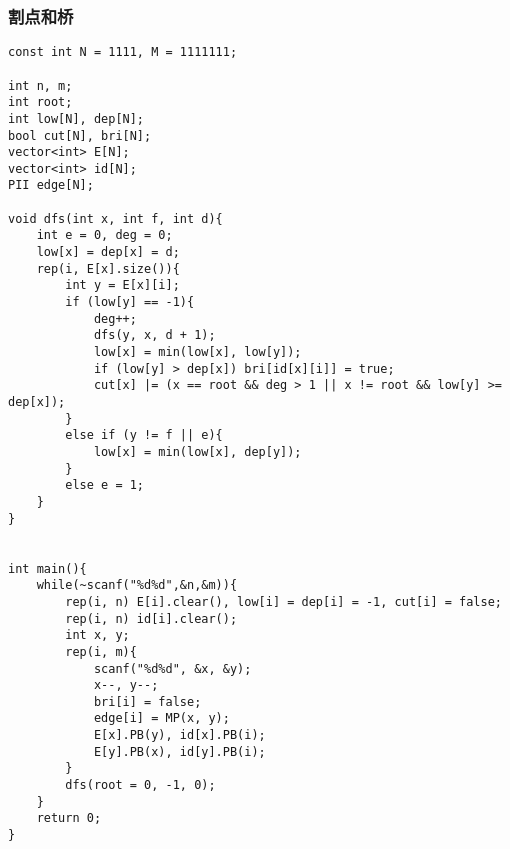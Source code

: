 \subsubsection{割点和桥}
\begin{verbatim}
const int N = 1111, M = 1111111;

int n, m;
int root;
int low[N], dep[N];
bool cut[N], bri[N];
vector<int> E[N];
vector<int> id[N];
PII edge[N];

void dfs(int x, int f, int d){
    int e = 0, deg = 0;
    low[x] = dep[x] = d;
    rep(i, E[x].size()){
        int y = E[x][i];
        if (low[y] == -1){
            deg++;
            dfs(y, x, d + 1);
            low[x] = min(low[x], low[y]);
            if (low[y] > dep[x]) bri[id[x][i]] = true;
            cut[x] |= (x == root && deg > 1 || x != root && low[y] >= dep[x]);
        }
        else if (y != f || e){
            low[x] = min(low[x], dep[y]);
        }
        else e = 1;
    }
}


int main(){
    while(~scanf("%d%d",&n,&m)){
        rep(i, n) E[i].clear(), low[i] = dep[i] = -1, cut[i] = false;
        rep(i, n) id[i].clear();
        int x, y;
        rep(i, m){
            scanf("%d%d", &x, &y);
            x--, y--;
            bri[i] = false;
            edge[i] = MP(x, y);
            E[x].PB(y), id[x].PB(i);
            E[y].PB(x), id[y].PB(i);
        }
        dfs(root = 0, -1, 0);
    }
    return 0;
}
\end{verbatim}
